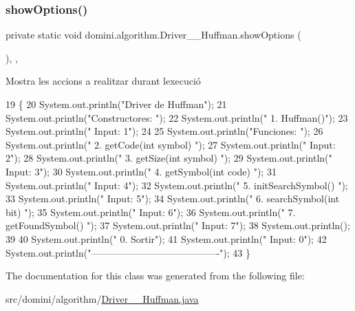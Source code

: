 \subsubsection{\texorpdfstring{show\+Options()}{showOptions()}}
{\footnotesize\ttfamily private static void domini.\+algorithm.\+Driver\+\_\+\+\_\+\+Huffman.\+show\+Options (\begin{DoxyParamCaption}{ }\end{DoxyParamCaption})\hspace{0.3cm}{\ttfamily [inline]}, {\ttfamily [static]}, {\ttfamily [private]}}



Mostra les accions a realitzar durant l\textquotesingle{}execució 


\begin{DoxyCode}
19                                      \{
20         System.out.println(\textcolor{stringliteral}{"Driver de Huffman"});
21         System.out.println(\textcolor{stringliteral}{"Constructores: "});
22         System.out.println(\textcolor{stringliteral}{"     1. Huffman()"});
23         System.out.println(\textcolor{stringliteral}{"     Input: 1"});
24 
25         System.out.println(\textcolor{stringliteral}{"Funciones: "});
26         System.out.println(\textcolor{stringliteral}{"     2. getCode(int symbol) "});
27         System.out.println(\textcolor{stringliteral}{"     Input: 2"});
28         System.out.println(\textcolor{stringliteral}{"     3. getSize(int symbol) "});
29         System.out.println(\textcolor{stringliteral}{"     Input: 3"});
30         System.out.println(\textcolor{stringliteral}{"     4. getSymbol(int code) "});
31         System.out.println(\textcolor{stringliteral}{"     Input: 4"});
32         System.out.println(\textcolor{stringliteral}{"     5. initSearchSymbol() "});
33         System.out.println(\textcolor{stringliteral}{"     Input: 5"});
34         System.out.println(\textcolor{stringliteral}{"     6. searchSymbol(int bit) "});
35         System.out.println(\textcolor{stringliteral}{"     Input: 6"});
36         System.out.println(\textcolor{stringliteral}{"     7. getFoundSymbol() "});
37         System.out.println(\textcolor{stringliteral}{"     Input: 7"});
38         System.out.println();
39 
40         System.out.println(\textcolor{stringliteral}{"     0. Sortir"});
41         System.out.println(\textcolor{stringliteral}{"     Input: 0"});
42         System.out.println(\textcolor{stringliteral}{"----------------------------------------"});
43     \}
\end{DoxyCode}


The documentation for this class was generated from the following file\+:\begin{DoxyCompactItemize}
\item 
src/domini/algorithm/\hyperlink{Driver____Huffman_8java}{Driver\+\_\+\+\_\+\+Huffman.\+java}\end{DoxyCompactItemize}
